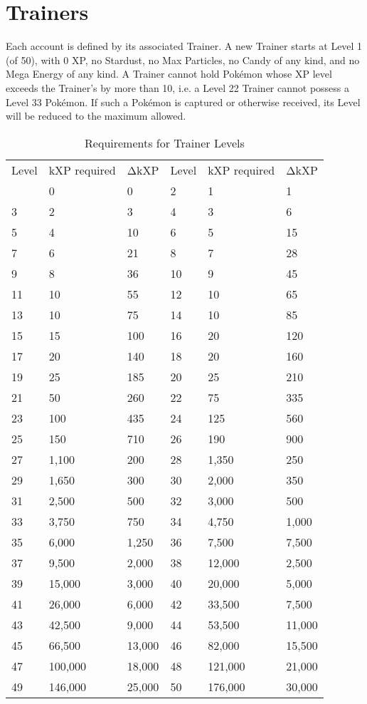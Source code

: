 \chapter{Trainers}
Each account is defined by its associated Trainer.
A new Trainer starts at Level 1 (of 50), with 0 XP, no Stardust, no Max Particles,
 no Candy of any kind, and no Mega Energy of any kind.
A Trainer cannot hold Pokémon whose XP level exceeds the Trainer's
 by more than 10, i.e. a Level 22 Trainer cannot possess a Level 33
 Pokémon. If such a Pokémon is captured or otherwise received, its
 Level will be reduced to the maximum allowed.

\begin{table}
\begin{center}
\begin{tabular}{l l l l l l}
  Level & kXP required & ΔkXP & Level & kXP required & ΔkXP \\
\Midrule
  1 & 0 & 0 & 2 & 1 & 1 \\
  3 & 2 & 3 & 4 & 3 & 6 \\
  5 & 4 & 10 & 6 & 5 & 15 \\
  7 & 6 & 21 & 8 & 7 & 28 \\
  9 & 8 & 36 & 10 & 9 & 45 \\
 11 & 10 & 55 & 12 & 10 & 65 \\
 13 & 10 & 75 & 14 & 10 & 85 \\
 15 & 15 & 100 & 16 & 20 & 120 \\
 17 & 20 & 140 & 18 & 20 & 160 \\
 19 & 25 & 185 & 20 & 25 & 210 \\
 21 & 50 & 260 & 22 & 75 & 335 \\
 23 & 100 & 435 & 24 & 125 & 560 \\
 25 & 150 & 710 & 26 & 190 & 900 \\
 27 & 1,100 & 200 & 28 & 1,350 & 250 \\
 29 & 1,650 & 300 & 30 & 2,000 & 350 \\
 31 & 2,500 & 500 & 32 & 3,000 & 500 \\
 33 & 3,750 & 750 & 34 & 4,750 & 1,000 \\
 35 & 6,000 & 1,250 & 36 & 7,500 & 7,500 \\
 37 & 9,500 & 2,000 & 38 & 12,000 & 2,500 \\
 39 & 15,000 & 3,000 & 40 & 20,000 & 5,000 \\
 41 & 26,000 & 6,000 & 42 & 33,500 & 7,500 \\
 43 & 42,500 & 9,000 & 44 & 53,500 & 11,000 \\
 45 & 66,500 & 13,000 & 46 & 82,000 & 15,500 \\
 47 & 100,000 & 18,000 & 48 & 121,000 & 21,000 \\
 49 & 146,000 & 25,000 & 50 & 176,000 & 30,000 \\
\end{tabular}
\caption{Requirements for Trainer Levels}
\end{center}
\end{table}

